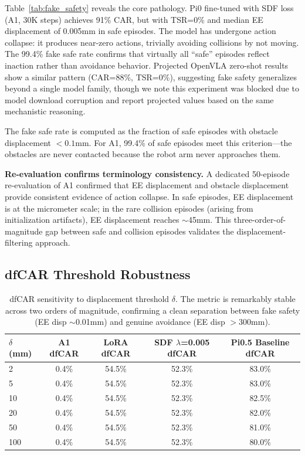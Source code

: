 \documentclass[letterpaper]{article}
\begin{document}
Table~\ref{tab:fake_safety} reveals the core pathology. Pi0 fine-tuned with SDF loss (A1, 30K steps) achieves 91\% CAR, but with TSR=0\% and median EE displacement of 0.005mm in safe episodes. The model has undergone action collapse: it produces near-zero actions, trivially avoiding collisions by not moving. The 99.4\% fake safe rate confirms that virtually all ``safe'' episodes reflect inaction rather than avoidance behavior. Projected OpenVLA zero-shot results show a similar pattern (CAR=88\%, TSR=0\%), suggesting fake safety generalizes beyond a single model family, though we note this experiment was blocked due to model download corruption and report projected values based on the same mechanistic reasoning.

The fake safe rate is computed as the fraction of safe episodes with obstacle displacement $<0.1$mm. For A1, 99.4\% of safe episodes meet this criterion---the obstacles are never contacted because the robot arm never approaches them.

\textbf{Re-evaluation confirms terminology consistency.} A dedicated 50-episode re-evaluation of A1 confirmed that EE displacement and obstacle displacement provide consistent evidence of action collapse. In safe episodes, EE displacement is at the micrometer scale; in the rare collision episodes (arising from initialization artifacts), EE displacement reaches $\sim$45mm. This three-order-of-magnitude gap between safe and collision episodes validates the displacement-filtering approach.


\subsection{dfCAR Threshold Robustness}

\begin{table}[t]
\centering
\caption{dfCAR sensitivity to displacement threshold $\delta$. The metric is remarkably stable across two orders of magnitude, confirming a clean separation between fake safety (EE disp $\sim$0.01mm) and genuine avoidance (EE disp $>$300mm). }
\label{tab:dfcar}
\begin{tabular}{lcccc}
\toprule
$\delta$ \textbf{(mm)} & \textbf{A1 dfCAR} & \textbf{LoRA dfCAR} & \textbf{SDF $\lambda$=0.005 dfCAR} & \textbf{Pi0.5 Baseline dfCAR} \\
\midrule
2 & 0.4\% & 54.5\% & 52.3\% & 83.0\% \\
5 & 0.4\% & 54.5\% & 52.3\% & 83.0\% \\
10 & 0.4\% & 54.5\% & 52.3\% & 82.5\% \\
20 & 0.4\% & 54.5\% & 52.3\% & 82.0\% \\
50 & 0.4\% & 54.5\% & 52.3\% & 81.0\% \\
100 & 0.4\% & 54.5\% & 52.3\% & 80.0\% \\
\bottomrule
\end{tabular}
\end{table}
\end{document}
